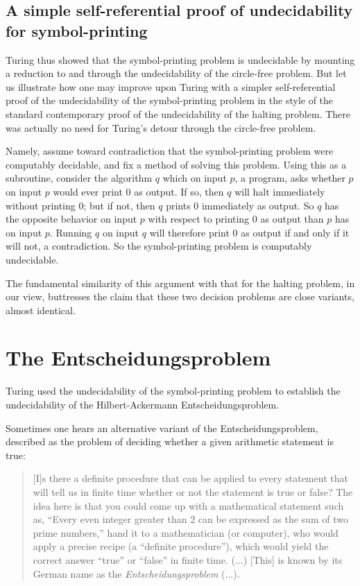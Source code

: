\documentclass[12pt]{amsart}
\begin{document}
\subsection{A simple self-referential proof of undecidability for symbol-printing}

Turing thus showed that the symbol-printing problem is undecidable by mounting a reduction to and through the undecidability of the circle-free problem. But let us illustrate how one may improve upon Turing with a simpler self-referential proof of the undecidability of the symbol-printing problem in the style of the standard contemporary proof of the undecidability of the halting problem. There was actually no need for Turing's detour through the circle-free problem. 

Namely, assume toward contradiction that the symbol-printing problem were computably decidable, and fix a method of solving this problem. Using this as a subroutine, consider the algorithm $q$ which on input $p$, a program, asks whether $p$ on input $p$ would ever print $0$ as output. If so, then $q$ will halt immediately without printing $0$; but if not, then $q$ prints $0$ immediately as output. So $q$ has the opposite behavior on input $p$ with respect to printing $0$ as output than $p$ has on input $p$. Running $q$ on input $q$ will therefore print $0$ as output if and only if it will not, a contradiction. So the symbol-printing problem is computably undecidable. 

The fundamental similarity of this argument with that for the halting problem, in our view, buttresses the claim that these two decision problems are close variants, almost identical.

\section{The Entscheidungsproblem}

Turing used the undecidability of the symbol-printing problem to establish the undecidability of the Hilbert-Ackermann \cite{hilbert1931grundzuge} Entscheidungsproblem. 

Sometimes one hears an alternative variant of the Entscheidungsproblem, described as the problem of deciding whether a given arithmetic statement is true:

\begin{quote}\small
    [I]s there a definite procedure that can be applied to every statement that will tell us in finite time whether or not the statement is true or false? The idea here is that you could come up with a mathematical statement such as, \enquote{Every even integer greater than 2 can be expressed as the sum of two prime numbers,} hand it to a mathematician (or computer), who would apply a precise recipe (a \enquote{definite procedure}), which would yield the correct answer \enquote{true} or \enquote{false} in finite time. (...) [This] is known by its German name as the \textit{Entscheidungsproblem} (...). \cite[pp. 58-59]{mitchell2009complexity}
\end{quote} 
\end{document}
